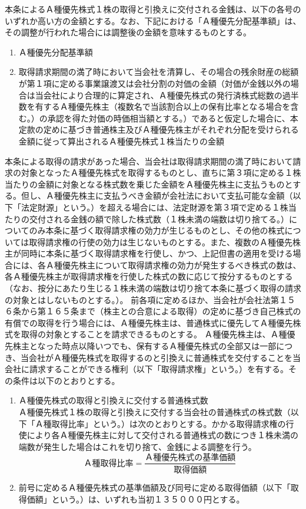 \documentclass[10pt,a4paper,uplatex]{jsarticle}
\begin{document}
\term 本条によるＡ種優先株式１株の取得と引換えに交付される金銭は、以下の各号のいずれか高い方の金額とする。なお、下記における「Ａ種優先分配基準額」は、その調整が行われた場合には調整後の金額を意味するものとする。
\begin{enumerate}
  \item Ａ種優先分配基準額
  \item 取得請求期間の満了時において当会社を清算し、その場合の残余財産の総額が第１項に定める事業譲渡又は会社分割の対価の金額（対価が金銭以外の場合は当会社により合理的に算定され、Ａ種優先株式の発行済株式総数の過半数を有するＡ種優先株主（複数名で当該割合以上の保有比率となる場合を含む。）の承認を得た対価の時価相当額とする。）であると仮定した場合に、本定款の定めに基づき普通株主及びＡ種優先株主がそれぞれ分配を受けられる金額に従って算出されるＡ種優先株式１株当たりの金額
\end{enumerate}
\term 本条による取得の請求があった場合、当会社は取得請求期間の満了時において請求の対象となったＡ種優先株式を取得するものとし、直ちに第３項に定める１株当たりの金額に対象となる株式数を乗じた金額をＡ種優先株主に支払うものとする。但し、Ａ種優先株主に支払うべき金額が会社法において支払可能な金額（以下「法定財源」という。）を超える場合には、法定財源を第３項で定める１株当たりの交付される金銭の額で除した株式数（１株未満の端数は切り捨てる。）についてのみ本条に基づく取得請求権の効力が生じるものとし、その他の株式については取得請求権の行使の効力は生じないものとする。また、複数のＡ種優先株主が同時に本条に基づく取得請求権を行使し、かつ、上記但書の適用を受ける場合には、各Ａ種優先株主について取得請求権の効力が発生するべき株式の数は、各Ａ種優先株主が取得請求権を行使した株式の数に応じて按分するものとする（なお、按分にあたり生じる１株未満の端数は切り捨て本条に基づく取得の請求の対象とはしないものとする。）。
\term 前各項に定めるほか、当会社が会社法第１５６条から第１６５条まで（株主との合意による取得）の定めに基づき自己株式の有償での取得を行う場合には、Ａ種優先株主は、普通株式に優先してＡ種優先株式を取得の対象とすることを請求できるものとする。
Ａ種優先株主は、Ａ種優先株主となった時点以降いつでも、保有するＡ種優先株式の全部又は一部につき、当会社がＡ種優先株式を取得するのと引換えに普通株式を交付することを当会社に請求することができる権利（以下「取得請求権」という。）を有する。その条件は以下のとおりとする。
\label{普通株式と引換えにする取得請求権}
\begin{enumerate}
  \item Ａ種優先株式の取得と引換えに交付する普通株式数\\
  Ａ種優先株式１株の取得と引換えに交付する当会社の普通株式の株式数（以下「Ａ種取得比率」という。）は次のとおりとする。かかる取得請求権の行使により各Ａ種優先株主に対して交付される普通株式の数につき１株未満の端数が発生した場合はこれを切り捨て、金銭による調整を行う。
  \begin{displaymath}
  Ａ種取得比率 = \frac{Ａ種優先株式の基準価額}{取得価額}
  \end{displaymath}
  \item 前号に定めるＡ種優先株式の基準価額及び同号に定める取得価額（以下「取得価額」という。）は、いずれも当初１３５０００円とする。
\end{enumerate}
\end{document}
